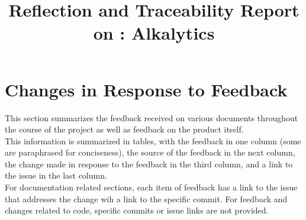 \documentclass{article}
\title{Reflection and Traceability Report on \progname: Alkalytics}
\author{\authname}
\date{}
\begin{document}
\maketitle


\section{Changes in Response to Feedback}
This section summarizes the feedback received on various documents throughout
the course of the project as well as feedback on the product itself.\\

This information is summarized in tables, with the feedback in one column (some
are paraphrased for conciseness), the source of the feedback in the next column,
the change made in response to the feedback in the third column, and a link to
the issue in the last column. \\

For documentation related sections, each item of feedback has a link to the
issue that addresses the change wih a link to the specific commit. For feedback
and changes related to code, specific commits or issue links are not provided.



\end{document}
